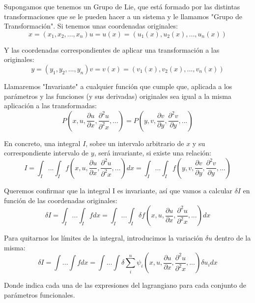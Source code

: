Supongamos que tenemos un Grupo de Lie, que está formado por las distintas transformaciones que se le pueden hacer a un sistema y le llamamos "Grupo de Transformación".
Si tenemos unas coordenadas originales:
\begin{equation}
    x = (x_1, x_2, ..., x_n)
    u = u(x) = (u_1(x), u_2(x), ..., u_n(x))
\end{equation}

Y las coordenadas correspondientes de aplicar una transformación a las originales:
\begin{equation}
    y = (y_1, y_2, ..., y_n)
    v = v(x) = (v_1(x), v_2(x), ..., v_n(x))
\end{equation}

Llamaremos "Invariante" a cualquier función que cumple que, aplicada a los parámetros y las funciones (y sus derivadas) originales sea igual a la misma aplicación a las transformadas:
\begin{equation}
    P(x,u,\frac{\partial u}{\partial x}, \frac{\partial^2 u}{\partial^2 x}, ...) = P(y, v, \frac{\partial v}{\partial y}, \frac{\partial^2 v}{\partial y}, ...)
\end{equation}

En concreto, una integral $I$, sobre un intervalo arbitrario de $x$ y su correspondiente intervalo de $y$, será invariante, si existe una relación:
\begin{equation}
    I = \int_I ...\int_I f(x,u,\frac{\partial u}{\partial x}, \frac{\partial^2 u}{\partial^2 x}, ...) dx = \int_I ...\int_I f(y, v, \frac{\partial v}{\partial y}, \frac{\partial^2 v}{\partial y}, ...)
\end{equation}

Queremos confirmar que la integral I es invariante, así que vamos a calcular $\delta I$ en función de las coordenadas originales:
\begin{equation}
    \delta I = \int_I ... \int_I f dx = \int_I ... \int_I \delta f(x,u,\frac{\partial u}{\partial x}, \frac{\partial^2 u}{\partial^2 x}, ...) dx 
\end{equation}

Para quitarnos los límites de la integral, introducimos la variación $\delta u$ dentro de la misma:
\begin{equation}
    \delta I = \int ... \int f dx = \int ... \int \delta \sum_i^n \psi_i(x,u,\frac{\partial u}{\partial x}, \frac{\partial^2 u}{\partial^2 x}, ...) \delta u_i dx 
\end{equation}

Donde \psi indica cada una de las expresiones del lagrangiano para cada conjunto de parámetros funcionales.